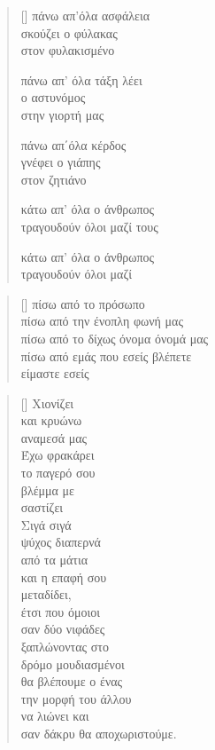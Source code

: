 \documentclass[12pt]{article}
\begin{document}
\newpage

\settowidth{\versewidth}{κατω απ' όλα ο άνθρω}
\begin{verse}[\versewidth]
  πάνω απ'όλα ασφάλεια \\
  σκούζει ο φύλακας \\
  στον φυλακισμένο

  πάνω απ' όλα τάξη λέει \\
  ο αστυνόμος \\
  στην γιορτή μας

  πάνω απ΄όλα κέρδος \\
  γνέφει ο γιάπης \\
  στον ζητιάνο

  κάτω απ' όλα ο άνθρωπος \\
  τραγουδούν όλοι μαζί τους

  κάτω απ' όλα ο άνθρωπος \\
  τραγουδούν όλοι μαζί
\end{verse}

\newpage

\settowidth{\versewidth}{πίσω από το δίχως όνομα}
\begin{verse}[\versewidth]
  πίσω από το πρόσωπο \\
  πίσω από την ένοπλη φωνή μας \\
  πίσω από το δίχως όνομα όνομά μας \\
  πίσω από εμάς που εσείς βλέπετε \\
  είμαστε εσείς
\end{verse}

\newpage

\settowidth{\versewidth}{σαν δάκρυ}
\begin{verse}[\versewidth]
  Χιονίζει \\
  και κρυώνω \\
  αναμεσά μας \\
  Έχω φρακάρει \\
  το παγερό σου \\
  βλέμμα με \\
  σαστίζει \\
  Σιγά σιγά \\
  ψύχος διαπερνά \\
  από τα μάτια \\
  και η επαφή σου \\
  μεταδίδει, \\
  έτσι που όμοιοι \\
  σαν δύο νιφάδες \\
  ξαπλώνοντας στο \\
  δρόμο μουδιασμένοι \\
  θα βλέπουμε ο ένας \\
  την μορφή του άλλου \\
  να λιώνει και \\
  σαν δάκρυ θα αποχωριστούμε.
\end{verse}
\end{document}
